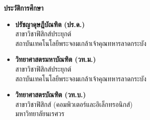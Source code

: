 \begin{tcolorbox}[
    enhanced,
    colback=white,
    colframe=rbruNavy!85!black,
    arc=3mm,
    boxrule=1pt,
    top=8pt, bottom=8pt, left=10pt, right=10pt,
    drop shadow=black!8
]
    \begin{minipage}[t]{0.48\textwidth}
        {\large\bfseries\color{agriGreen} ประวัติการศึกษา}
        \vspace{3pt}
        \begin{itemize}[leftmargin=1.1em, itemsep=1.5pt, topsep=1pt]
            \item \textbf{ปรัชญาดุษฎีบัณฑิต (ปร.ด.)}\\
            สาขาวิชาฟิสิกส์ประยุกต์\\
            สถาบันเทคโนโลยีพระจอมเกล้าเจ้าคุณทหารลาดกระบัง
            \item \textbf{วิทยาศาสตรมหาบัณฑิต (วท.ม.)}\\
            สาขาวิชาฟิสิกส์ประยุกต์\\
            สถาบันเทคโนโลยีพระจอมเกล้าเจ้าคุณทหารลาดกระบัง
            \item \textbf{วิทยาศาสตรบัณฑิต (วท.บ.)}\\
            สาขาวิชาฟิสิกส์ (คอมพิวเตอร์และอิเล็กทรอนิกส์)\\
            มหาวิทยาลัยนเรศวร
        \end{itemize}


\end{minipage}
\end{tcolorbox}
